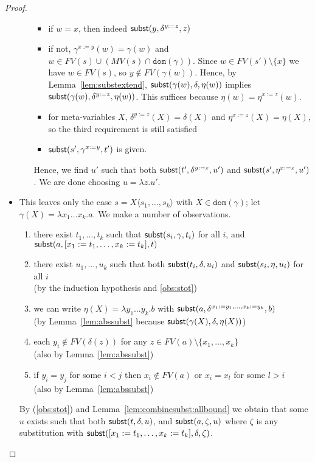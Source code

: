 \documentclass{lmcs}
\theoremstyle{theorem}\newtheorem{theorem}{Theorem}
\theoremstyle{theorem}\newtheorem{lemma}[theorem]{Lemma}
\theoremstyle{theorem}\newtheorem{corollary}[theorem]{Corollary}
\theoremstyle{definition}\newtheorem{definition}[theorem]{Definition}
\theoremstyle{definition}\newtheorem{example}[theorem]{Example}
\newcommand{\FV}{\mathit{FV}}
\newcommand{\FMV}{\mathit{MV}}
\newcommand{\domain}{\mathtt{dom}}
\newcommand{\avar}{x}
\newcommand{\bvar}{y}
\newcommand{\cvar}{z}
\newcommand{\Avar}{X}
\newcommand{\abs}[2]{\lambda #1.#2}
\newcommand{\meta}[2]{#1\langle#2\rangle}
\begin{document}
\begin{proof}
\begin{itemize}
\begin{itemize}
\begin{itemize}
    \item if $w = \avar$, then indeed $\subrel{\bvar,\delta^{\bvar:=\cvar},
      \cvar}$
    \item if not, $\gamma^{\avar:=\bvar}(w) = \gamma(w)$ and $w \in \FV(s) \cup
      (\FMV(s) \cap \domain(\gamma))$. Since $w \in \FV(s') \setminus \{\avar\}$
      we have $w \in \FV(s)$, so $\bvar \notin \FV(\gamma(w))$.
      Hence, by Lemma~\ref{lem:substextend},
      $\mathsf{subst}(\gamma(w),\delta,\eta(w))$ implies $\subrel{\gamma(w),
      \delta^{\bvar:=\cvar},\eta(w)}$.  This suffices because
      $\eta(w) = \eta^{\avar:=\cvar}(w)$.
    \item for meta-variables $\Avar$, $\delta^{\bvar:=\cvar}(\Avar) =
      \delta(\Avar)$ and $\eta^{\avar:=\cvar}(\Avar) = \eta(\Avar)$, so the
      third requirement is still satisfied
    \item $\subrel{s',\gamma^{\avar:=\bvar},t'}$ is given. \\
    \end{itemize}
    Hence, we find $u'$ such that both $\subrel{t',\delta^{\bvar:=\cvar},u'}$
    and $\subrel{s',\eta^{\avar:=\cvar},u'}$.  We are done choosing
    $u = \abs{\cvar}{u'}$.
  \end{itemize}
\item This leaves only the case $s = \meta{\Avar}{s_1,\dots,s_k}$ with
  $\Avar \in \domain(\gamma)$; let $\gamma(\Avar) = \abs{\avar_1 \dots
  \avar_k}{a}$.  We make a number of observations.
  \begin{enumerate}
  \item\label{obs:stot}
    there exist $t_1,\dots,t_k$ such that
    $\mathsf{subst}(s_i,\gamma,t_i)$ for all $i$, and
    $\subrel{a,[\avar_1:=t_1,\dots,\avar_k:=t_k],t}$
  \item\label{obs:stoui}
    there exist $u_1,\dots,u_k$ such that both
    $\mathsf{subst}(t_i,\delta,u_i)$ and $\mathsf{subst}(s_i,\eta,u_i)$ for all $i$
    \\ (by the induction hypothesis and \ref{obs:stot})
  \item\label{obs:etaX}
    we can write $\eta(\Avar) = \abs{\bvar_1 \dots \bvar_k}{b}$ with
    $\subrel{a,\delta^{\avar_1:=\bvar_1,\dots,\avar_k:=\bvar_k},b}$
    \\ (by Lemma~\ref{lem:abssubst} because $\subrel{\gamma(\Avar),\delta,
    \eta(\Avar)}$)
  \item\label{obs:bvari}
    each $\bvar_i \notin \FV(\delta(\cvar))$ for any $\cvar \in \FV(a)
    \setminus \{\avar_1,\dots,\avar_k\}$
    \\ (also by Lemma~\ref{lem:abssubst})
  \item if $\bvar_i = \bvar_j$ for some $i < j$ then $\avar_i \notin
    \FV(a)$ or $\avar_i = \avar_l$ for some $l > i$
    \\ (also by Lemma~\ref{lem:abssubst})
  \end{enumerate}
  By (\ref{obs:stot}) and Lemma~\ref{lem:combinesubst:allbound} we obtain that
  some $u$ exists such that both $\mathsf{subst}(t,\delta,u)$, and
  $\mathsf{subst}(a,\zeta,u)$ where $\zeta$ is any substitution with
  $\subrel{[\avar_1:=t_1,\dots,\avar_k:=t_k],\delta,\zeta}$.
\end{itemize}


\end{proof}
\end{document}
